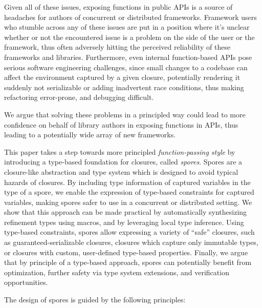 \documentclass{llncs}
\begin{document}
Given all of these issues, exposing functions in public APIs is a source of
headaches for authors of concurrent or distributed frameworks. Framework users
who stumble across any of these issues are put in a position where it's
unclear whether or not the encountered issue is a problem on the side of the
user or the framework, thus often adversely hitting the perceived reliability
of these frameworks and libraries. Furthermore, even internal
function-based APIs pose serious software engineering challenges, since small
changes to a codebase can affect the environment captured by a given closure,
potentially rendering it suddenly not serializable or adding inadvertent
race conditions, thus making refactoring error-prone, and debugging difficult.

We argue that solving these problems in a principled way could lead to more
confidence on behalf of library authors in exposing functions in APIs, thus
leading to a potentially wide array of new frameworks.

This paper takes a step towards more principled {\em function-passing style}
by introducing a type-based foundation for closures, called {\em spores}.
Spores are a closure-like abstraction and type system which is designed to
avoid typical hazards of closures. By including type information of captured
variables in the type of a spore, we enable the expression of type-based
constraints for captured variables, making spores safer to use in a concurrent
or distributed setting. We show that this approach can be made practical by
automatically synthesizing refinement types using macros, and by leveraging
local type inference. Using type-based constraints, spores allow expressing a
variety of ``safe'' closures, such as guaranteed-serializable closures,
closures which capture only immutable types, or closures with custom, user-defined
type-based properties. Finally, we argue that by principle of a type-based
approach, spores can potentially benefit from optimization, further
safety via type system extensions, and verification opportunities.

The design of spores is guided by the following principles:
\end{document}
